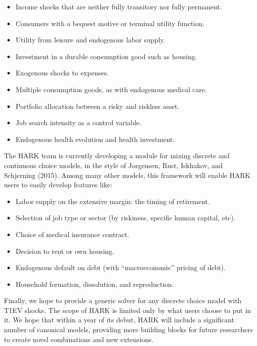 \documentclass[12pt,titlepage,letterpaper]{econtex}
\begin{document}
{\begin{itemize}
\item Income shocks that are neither fully transitory nor fully permanent.

\item Consumers with a bequest motive or terminal utility function.

\item Utility from leisure and endogenous labor supply.

\item Investment in a durable consumption good such as housing.

\item Exogenous shocks to expenses.

\item Multiple consumption goods, as with endogenous medical care.

\item Portfolio allocation between a risky and riskless asset.

\item Job search intensity as a control variable.

\item Endogenous health evolution and health investment.
\end{itemize}

The HARK team is currently developing a module for mixing discrete and continuous choice models, in the style of Jorgensen, Rust, Iskhakov, and Schjerning (2015).  Among many other models, this framework will enable HARK users to easily develop features like:
\begin{itemize}
\item Labor supply on the extensive margin: the timing of retirement.

\item Selection of job type or sector (by riskiness, specific human capital, etc).

\item Choice of medical insurance contract.

\item Decision to rent or own housing.

\item Endogenous default on debt (with ``macroeconomic'' pricing of debt).

\item Household formation, dissolution, and reproduction.
\end{itemize}

Finally, we hope to provide a generic solver for any discrete choice model with T1EV shocks.  The scope of HARK is limited only by what users choose to put in it.  We hope that within a year of its debut, HARK will include a significant number of canonical models, providing more building blocks for future researchers to create novel combinations and new extensions.

}
\end{document}
